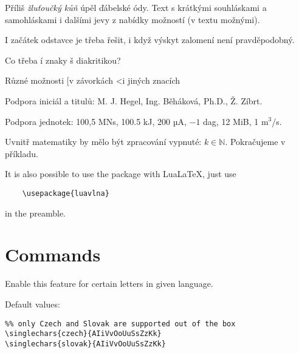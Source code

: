 \documentclass[12pt]{ltxdoc}
\newenvironment{mycode}{
	\medskip%
	\parindent=0pt%
}{\medskip}
\begin{document}

\noindent
\begin{minipage}{3in}
\preventsingledebugon
{}
Příliš \textit{žluťoučký kůň} úpěl ďábelské ódy. 
Text s krátkými souhláskami a samohláskami i dalšími jevy z nabídky možností (v textu možnými). 

I začátek odstavce je třeba řešit, i když výskyt zalomení není pravděpodobný.

Co třeba í znaky š diakritikou?

Různé možnosti [v závorkách \textless i jiných znacích

Podpora iniciál a titulů: M. J. Hegel, Ing. Běháková, Ph.D., Ž. Zíbrt.

Podpora jednotek: 100,5 MN\cdot{}s, 100.5 kJ, 200 µA, $-1$ dag, 12 MiB, 1 m$^3$/s.

Uvnitř matematiky by mělo být zpracování vypnuté:  $k \in \mathbb N$. Pokračujeme v příkladu.

\preventsingledebugoff
\end{minipage}

\bigskip
It is also possible to use the package with Lua\LaTeX, just use

\begin{verbatim}
	\usepackage{luavlna}
\end{verbatim}

in the preamble.

\section{Commands}

\begin{mycode}
\cmd{\singlechars} 
\end{mycode}

Enable this feature for certain letters in given language. 

Default values:

\begin{mycode}
\begin{verbatim}
%% only Czech and Slovak are supported out of the box
\singlechars{czech}{AIiVvOoUuSsZzKk}
\singlechars{slovak}{AIiVvOoUuSsZzKk}
\end{verbatim}
\end{mycode}
\end{document}
